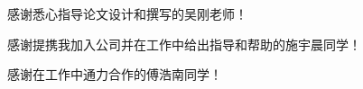 \begin{thanks}

  感谢悉心指导论文设计和撰写的吴刚老师！

  感谢提携我加入公司并在工作中给出指导和帮助的施宇晨同学！

  感谢在工作中通力合作的傅浩南同学！

\end{thanks}
